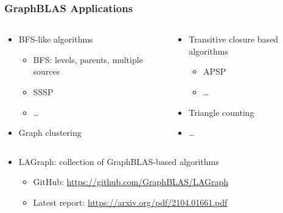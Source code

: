 \documentclass[xcolor=table,aspectratio=169]{beamer}
\begin{document}
\begin{frame}[fragile]
  \frametitle{GraphBLAS Applications}  
  \begin{columns}[t]
    \begin{column}{0.5\textwidth}
  \begin{itemize}
    \item BFS-like algorithms
    \begin{itemize}
      \item BFS: levels, parents, multiple sources
      \item SSSP
      \item \ldots
    \end{itemize}
    \item Graph clustering
  \end{itemize}
 \end{column}
\begin{column}{0.5\textwidth}
  \begin{itemize}
    \item Transitive closure based algorithms
    \begin{itemize}
      \item APSP      
      \item \ldots
    \end{itemize}
    \item Triangle counting    
    \item \ldots
  \end{itemize}
\end{column}
\end{columns}
\pause
\vspace{0.5cm}
\begin{itemize}
    \item LAGraph: collection of GraphBLAS-based algorithms  
  \begin{itemize}
    \item GitHub: \url{https://github.com/GraphBLAS/LAGraph}
    \item Latest report: \url{https://arxiv.org/pdf/2104.01661.pdf}
  \end{itemize}
\end{itemize}
\end{frame}
\end{document}
